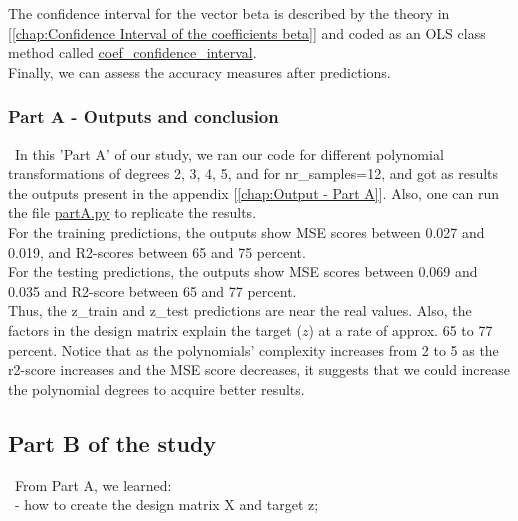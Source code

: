 The confidence interval for the vector beta is described by the theory in [\ref{chap:Confidence Interval of the coefficients beta}] and coded as an OLS class method called \href{https://github.com/fabiorodp/UiO-FYS-STK4155/blob/master/Project1/package/Create_data.py}{coef\_confidence\_interval}.\\

Finally, we can assess the accuracy measures after predictions.\\

\subsubsection{Part A - Outputs and conclusion}
\label{chap:Part A - Outputs and conclusion}

\quad \, In this 'Part A' of our study, we ran our code for different polynomial transformations of degrees 2, 3, 4, 5, and for nr\_samples=12, and got as results the outputs present in the appendix [\ref{chap:Output - Part A}]. Also, one can run the file \href{https://github.com/fabiorodp/UiO-FYS-STK4155/blob/master/Project1/partA.py}{partA.py} to replicate the results.\\

For the training predictions, the outputs show MSE scores between 0.027 and 0.019, and R2-scores between 65 and 75 percent.\\

For the testing predictions, the outputs show MSE scores between 0.069 and 0.035 and R2-score between 65 and 77 percent.\\

Thus, the z\_train and z\_test predictions are near the real values. Also, the factors in the design matrix explain the target ($z$) at a rate of approx. 65 to 77 percent. Notice that as the polynomials' complexity increases from 2 to 5 as the r2-score increases and the MSE score decreases, it suggests that we could increase the polynomial degrees to acquire better results.\\

\subsection{Part B of the study}
\label{chap:Part B of the study}

\quad \, From Part A, we learned:\\

\quad \, - how to create the design matrix X and target z;\\ 

